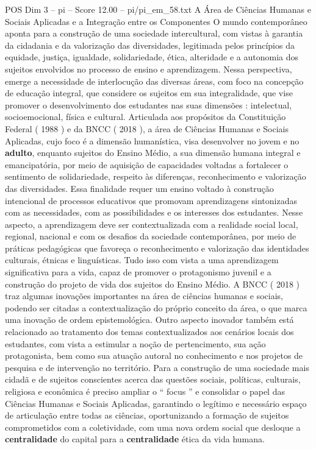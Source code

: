 \begin{textsample}{POS Dim 3 – pi – Score 12.00 – pi/pi\_em\_58.txt}  \label{ex:f3_pos_260}
A Área de Ciências Humanas e Sociais Aplicadas e a Integração entre os Componentes O mundo contemporâneo aponta para a construção de uma sociedade intercultural, com vistas à garantia da cidadania e da valorização das diversidades, legitimada pelos princípios da equidade, justiça, igualdade, solidariedade, ética, alteridade e a autonomia dos sujeitos envolvidos no processo de ensino e aprendizagem.
Nessa perspectiva, emerge a necessidade de interlocução das diversas áreas, com foco na concepção de educação integral, que considere os sujeitos em sua integralidade, que vise promover o desenvolvimento dos estudantes nas suas dimensões : intelectual, socioemocional, física e cultural.
Articulada aos propósitos da Constituição Federal ( 1988 ) e da BNCC ( 2018 ), a área de Ciências Humanas e Sociais Aplicadas, cujo foco é a dimensão humanística, visa desenvolver no jovem e no \textbf{adulto}, enquanto sujeitos do Ensino Médio, a sua dimensão humana integral e emancipatória, por meio de aquisição de capacidades voltadas a fortalecer o sentimento de solidariedade, respeito às diferenças, reconhecimento e valorização das diversidades.
Essa finalidade requer um ensino voltado à construção intencional de processos educativos que promovam aprendizagens sintonizadas com as necessidades, com as possibilidades e os interesses dos estudantes.
Nesse aspecto, a aprendizagem deve ser contextualizada com a realidade social local, regional, nacional e com os desafios da sociedade contemporânea, por meio de práticas pedagógicas que favoreça o reconhecimento e valorização das identidades culturais, étnicas e linguísticas.
Tudo isso com vista a uma aprendizagem significativa para a vida, capaz de promover o protagonismo juvenil e a construção do projeto de vida dos sujeitos do Ensino Médio.
A BNCC ( 2018 ) traz algumas inovações importantes na área de ciências humanas e sociais, podendo ser citadas a contextualização do próprio conceito da área, o que marca uma inovação de ordem epistemológica.
Outro aspecto inovador também está relacionado ao tratamento dos temas contextualizados aos cenários locais dos estudantes, com vista a estimular a noção de pertencimento, sua ação protagonista, bem como sua atuação autoral no conhecimento e nos projetos de pesquisa e de intervenção no território.
Para a construção de uma sociedade mais cidadã e de sujeitos conscientes acerca das questões sociais, políticas, culturais, religiosa e econômica é preciso ampliar o “ focus ” e consolidar o papel das Ciências Humanas e Sociais Aplicadas, garantindo o legítimo e necessário espaço de articulação entre todas as ciências, oportunizando a formação de sujeitos comprometidos com a coletividade, com uma nova ordem social que desloque a \textbf{centralidade} do capital para a \textbf{centralidade} ética da vida humana.

\end{textsample}
